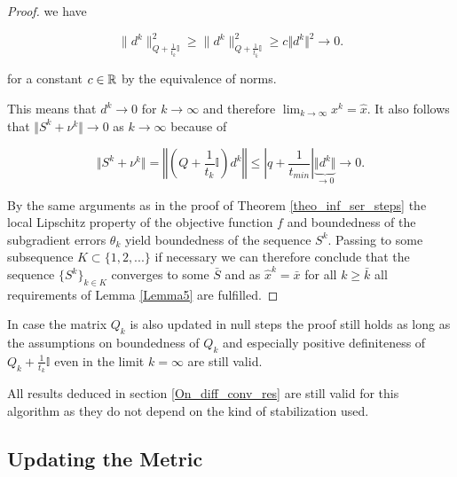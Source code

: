 \begin{proof}
we have 

\begin{equation*}
	  \lVert d^k\rVert^2_{Q+\frac{1}{t_k}\mathbb{I}} \geq  \lVert d^k\rVert^2_{Q+\frac{1}{t_{\bar{k}}}\mathbb{I}} \geq c\Vert d^k\Vert^2 \to 0.
\end{equation*}

for a constant \(c \in \mathbb{R} \) by the equivalence of norms.

This means that \(d^k \to 0\) for \(k \to \infty\) and therefore \(\lim_{k \to \infty}x^k = \hat{x}\). It also follows that \(\Vert S^k+\nu^k\Vert \to 0\) as \(k \to \infty\) because of 

\[ \Vert S^{{k}} + \nu^{{k}} \Vert = \left\Vert\left(Q+\frac{1}{t_{{k}}}\mathbb{I}\right)d^{{k}} \right\Vert \leq \left \vert q + \frac{1}{t_{min}}\right\vert \underbrace{\Vert d^{k}\Vert}_{\to 0} \to 0.\]

By the same arguments as in the proof of Theorem \ref{theo_inf_ser_steps} the local Lipschitz property of the objective function \(f\) and boundedness of the subgradient errors \(\theta_k\) yield boundedness of the sequence \(S^k\). Passing to some subsequence \(K \subset \{1,2,...\}\) if necessary we can therefore conclude that the sequence \(\{S^k\}_{k\in K}\) converges to some \(\bar{S}\) and as \(\hat{x}^k = \bar{x}\) for all \(k \geq \bar{k}\) all requirements of Lemma \ref{Lemma5} are fulfilled.

\end{proof}

\begin{remark}
	In case the matrix \(Q_k\) is also updated in null steps the proof still holds as long as the assumptions on boundedness of \(Q_k\) and especially  positive definiteness of \(Q_k+\frac{1}{t_k}\mathbb{I}\) even in the limit \(k = \infty\) are still valid.
\end{remark}

\begin{remark}
	All results deduced in section \ref{On_diff_conv_res} are still valid for this algorithm as they do not depend on the kind of stabilization used.
\end{remark}

\subsection{Updating the Metric}
\label{sec_upd_Q}


